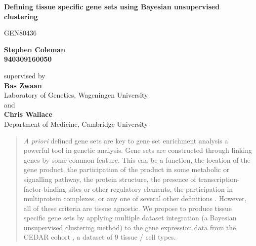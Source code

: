 \documentclass[12pt]{article} %
\begin{document}
 \pgfplotsset{compat=1.15}
	
	\begin{titlepage}
		\begin{center}
			\vspace*{1cm}
			
			\par{\LARGE \textbf{Defining tissue specific gene sets using Bayesian unsupervised clustering}}
			
			\vspace{0.5cm}
			GEN80436
			
			\vspace{1.5cm}
			
			\textbf{Stephen Coleman \\ 940309160050}
			
			\vspace{0.8cm}
			
			supervised by \\
			\textbf{Bas Zwaan} \\
			Laboratory of Genetics, Wageningen University \\
			and \\
			\textbf{Chris Wallace} \\
			Department of Medicine, Cambridge University
			

			
			\vspace{1.0cm}
	
			\begin{abstract}
				\emph{A priori} defined gene sets are key to gene set enrichment analysis \cite{subramanian_gene_2005} a powerful tool in genetic analysis. Gene sets are constructed through linking genes by some common feature. This can be a function, the location of the gene product, the participation of the product in some metabolic or signalling pathway, the protein structure, the presence of transcription-factor-binding sites or other regulatory elements, the participation in multiprotein complexes, or any one of several other definitions \cite{szklarczyk_string_2019}\cite{subramanian_gene_2005}\cite{kanehisa_new_2019}\cite{ashburner_gene_2000}. However, all of these criteria are tissue agnostic.
				We propose to produce tissue specific gene sets by applying multiple dataset integration \cite{kirk_bayesian_2012} (a Bayesian unsupervised clustering method) to the gene expression data from the CEDAR cohort \cite{the_international_ibd_genetics_consortium_ibd_2018}, a dataset of 9 tissue / cell types.
			\end{abstract}
		

\end{center}
\end{titlepage}
\end{document}
